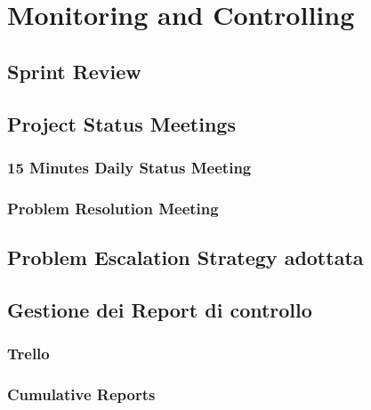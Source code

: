 \section{Monitoring and Controlling}

\subsection{Sprint Review}

\subsection{Project Status Meetings}

\subsubsection{15 Minutes Daily Status Meeting}

\subsubsection{Problem Resolution Meeting}

\subsection{Problem Escalation Strategy adottata}

\subsection{Gestione dei Report di controllo}

\subsubsection{Trello}

\subsubsection{Cumulative Reports}
